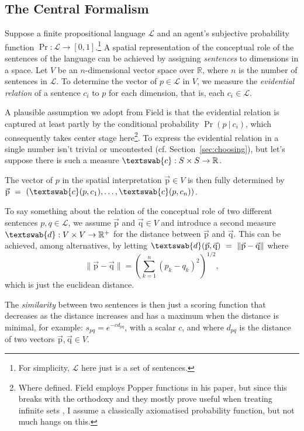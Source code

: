 \documentclass[11pt, a4paper]{scrartcl}
\renewcommand{\i}[1]{\emph{#1}}
\renewcommand{\L}{\mathcal{L}}
\renewcommand{\v}[1]{\vec{\mathrm{#1}}}
\newcommand{\m}[1]{\textswab{#1}}
\newcommand{\given}[1][]{\:#1\vert\:}
\begin{document}
\subsection{The Central Formalism}\label{sec:central}

Suppose a finite propositional language $\L$ and an agent's subjective probability function $\Pr: \L \rightarrow [0,1]$.\footnote{For simplicity, $\L$ here just is a set of sentences.} A spatial representation of the conceptual role of the sentences of the language can be achieved by assigning \i{sentences} to dimensions in a space. Let $V$ be an $n$-dimensional vector space over $\mathbb{R}$, where $n$ is the number of sentences in $\L$. To determine the vector of $p \in \L$ in $V$, we measure the \i{evidential relation} of a sentence $c_i$ to $p$ for each dimension, that is, each $c_i \in \L$. 

A plausible assumption we adopt from Field is that the evidential relation is captured at least partly by the conditional probability $\Pr(p \given c_i)$, which consequently takes center stage here\footnote{Where defined. Field employs Popper functions in his paper, but since this breaks with the orthodoxy and they mostly prove useful when treating infinite sets \parencite[1352]{Leitgeb2013-LEIRBS}, I assume a classically axiomatised probability function, but not much hangs on this.}. To express the evidential relation in a single number isn't trivial or uncontested (cf. Section~\ref{sec:choosing}), but let's suppose there is such a measure ${\m{c}: S \times S \rightarrow \mathbb{R}}$. 

The vector of $p$ in the spatial interpretation $\v{p} \in V$ is then fully determined by ${\v{p}~=~(\m{c}({p, c_1}),\dots, \m{c}(p, c_n))}$.

To say something about the relation of the conceptual role of two different sentences $p, q \in \L$, we assume $\v{p}$ and $\v{q} \in V$ and introduce a second measure $\m{d}: V \times V \rightarrow \mathbb{R}^+$ for the distance between $\v{p}$ and $\v{q}$. This can be achieved, among alternatives, by letting ${\m{d}(\v{p}, \v{q})~=~\lVert \v{p} - \v{q} \rVert}$ where 
\[
    \lVert \v{p}-\v{q} \rVert = {\left( \sum_{k=1}^n {(p_k-q_k)}^2 \right)}^{1/2}, 
\]
which is just the euclidean distance. 

The \i{similarity} between two sentences is then just a scoring function that decreases as the distance increases and has a maximum when the distance is minimal, for example: $s_{pq} = e^{-cd_{pq}}$, with a scalar $c$, and where $d_{pq}$ is the distance of two vectors $\v{p}, \v{q} \in V$. 
\end{document}
